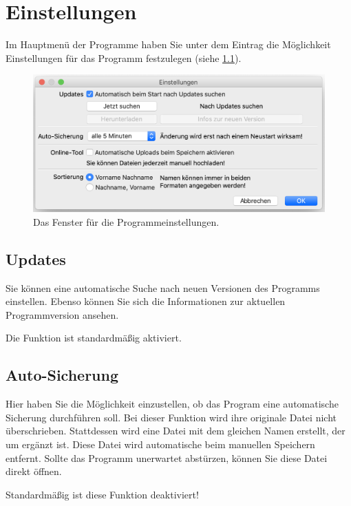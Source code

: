 \chapter{Einstellungen}\label{epl:alg:einstellungen}
Im Hauptmenü der Programme haben Sie unter dem Eintrag 
die Möglichkeit Einstellungen für das Programm festzulegen
(siehe \cref{fig:einstellungen}).
\begin{figure}[!h]
	\includegraphics[width=\textwidth]{img/einstellungen}
	\caption{Das Fenster für die Programmeinstellungen.}
	\label{fig:einstellungen}
\end{figure}



\section{Updates}
Sie können eine automatische Suche nach neuen Versionen des Programms einstellen.
Ebenso können Sie sich die Informationen zur aktuellen Programmversion ansehen.

Die Funktion ist standardmäßig aktiviert.



\section{Auto-Sicherung}
Hier haben Sie die Möglichkeit einzustellen, ob das Program eine automatische Sicherung durchführen soll.
Bei dieser Funktion wird ihre originale Datei nicht überschrieben.
Stattdessen wird eine Datei mit dem gleichen Namen erstellt, der um  ergänzt ist.
Diese Datei wird automatische beim manuellen Speichern entfernt.
Sollte das Programm unerwartet abstürzen, können Sie diese Datei direkt öffnen.

Standardmäßig ist diese Funktion deaktiviert!



